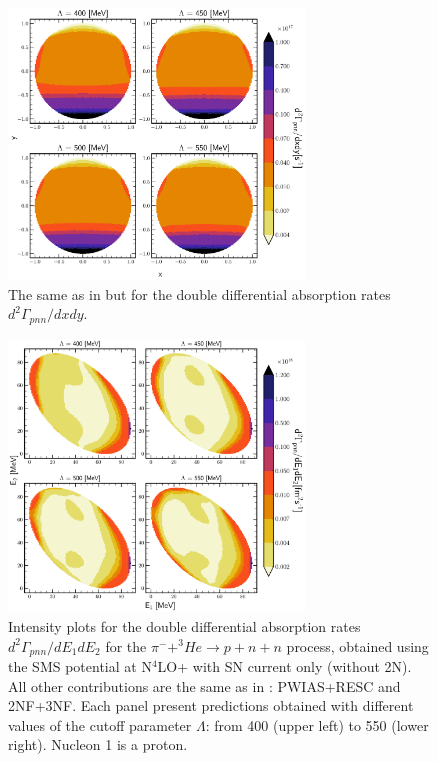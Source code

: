     \begin{figure}[h]
        \begin{center}
        \includegraphics[width=0.7\textwidth]{PlotData/PION/Dalitz_maps/figures/Dalitz_map_pnn_xy_cutofs_PWIAS.pdf}
        \end{center}
        \caption{The same as in  but for the double differential absorption rates
        $d^2 \Gamma_{pnn}/dxdy$.}
        \label{pion_map_xy_cutoff_PW}
    \end{figure}

    \begin{figure}[h]
        \begin{center}
        \includegraphics[width=0.7\textwidth]{PlotData/PION/Dalitz_maps/figures/Dalitz_map_pnn_E1E2_cutofs_1NC.pdf}
        \end{center}
        \caption{Intensity plots for the double differential absorption rates
        $d^2 \Gamma_{pnn}/dE_1dE_2$ for the $\pi^- + ^3He \rightarrow p + n + n$
        process, obtained using the SMS potential at N$^4$LO+
        with SN current only (without 2N).
        All other contributions are the same as in : PWIAS+RESC and 2NF+3NF.
        Each panel present predictions obtained with different values of the cutoff parameter $\Lambda$:
        from \SI{400}{\mev} (upper left) to \SI{550}{\mev} (lower right). Nucleon 1 is a proton.}
        \label{pion_map_E1E2_cutoff_1NC}
    \end{figure}

